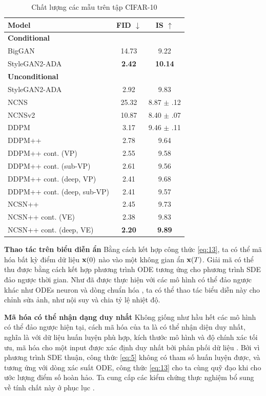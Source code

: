 \documentclass{article} %
\begin{document}
\begin{table}[h!]
    \centering
    \caption{Chất lượng các mẫu trên tập CIFAR-10}
    \begin{tabular}{lcc}
        \hline
        Model & FID $\downarrow$ & IS $\uparrow$ \\
        \hline
        \textbf{Conditional} & & \\
        BigGAN \citep{brock2018large} &  14.73 & 9.22 \\
        StyleGAN2-ADA \citep{karras2020training} & \textbf{2.42} & \textbf{10.14} \\
        \hline
        \textbf{Unconditional} & & \\
        StyleGAN2-ADA \citep{karras2020training} & 2.92 & 9.83 \\
        NCNS \citep{song2019generative} & 25.32 & 8.87 $\pm$ .12 \\
        NCNSv2 \citep{song2020improved} & 10.87 & 8.40 $\pm$ .07 \\
        DDPM \citep{ho2020denoising} & 3.17 & 9.46 $\pm$ .11 \\
        \hline
        DDPM++ & 2.78 & 9.64 \\
        DDPM++ cont. (VP) & 2.55 & 9.58 \\
        DDPM++ cont. (sub-VP) & 2.61 & 9.56 \\
        DDPM++ cont. (deep, VP) & 2.41 & 9.68 \\
        DDPM++ cont. (deep, sub-VP) & 2.41 & 9.57 \\
        NCSN++ & 2.45 & 9.73 \\
        NCSN++ cont. (VE) & 2.38 & 9.83 \\
        NCSN++ cont. (deep, VE) & \textbf{2.20} & \textbf{9.89} \\
        \hline
    \end{tabular}
    \label{tab:3}
\end{table}

\textbf{Thao tác trên biểu diễn ẩn} Bằng cách kết hợp công thức \ref{eq:13}, ta có thể mã hóa bất kỳ điểm dữ liệu $\bold{x}(0)$ nào vào một không gian ẩn $\bold{x}(T)$.
Giải mã có thể thu được bằng cách kết hợp phương trình ODE tương ứng cho phương trình SDE đảo ngược thời gian.
Như đã được thực hiện với các mô hình có thể đảo ngược khác như ODEs neuron và dòng chuẩn hóa \citep{dinh2016density, kingma2018glow}, ta có thể thao tác biểu diễn này cho chỉnh sửa ảnh, như nội suy và chia tỷ lệ nhiệt độ.

\textbf{Mã hóa có thể nhận dạng duy nhất} Không giống như hầu hết các mô hình có thể đảo ngược hiện tại,
cách mã hóa của ta là có thể nhận diện duy nhất, nghĩa là với dữ liệu huấn luyện phù hợp, kích thước mô hình và độ chính xác tối ưu, mã hóa cho một input được xác định duy nhất bởi phân phối dữ liệu \citep{roeder2021linear}.
Bởi vì phương trình SDE thuận, công thức \ref{eq:5} không có tham số huấn luyện được, và tương ứng với dòng xác suất ODE, công thức \ref{eq:13} cho ta cùng quỹ đạo khi cho ước lượng điểm số hoàn hảo.
Ta cung cấp các kiểm chứng thực nghiệm bổ sung về tính chất này ở phục lục .
\end{document}
